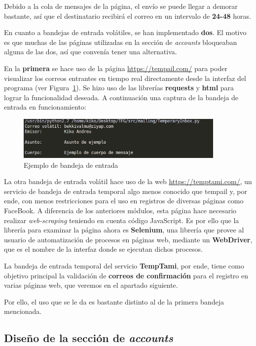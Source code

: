 Debido a la cola de mensajes de la página, el envío se puede llegar a demorar bastante, así que el destinatario recibirá el correo en un intervalo de \textbf{24-48} horas.

En cuanto a bandejas de entrada volátiles, se han implementado \textbf{dos}. El motivo es que muchas de las páginas utilizadas en la sección de \textit{accounts} bloqueaban alguna de las dos, así que convenía tener una alternativa.

En la \textbf{primera} se hace uso de la página \url{https://tempail.com/} para poder visualizar los correos entrantes en tiempo real directamente desde la interfaz del programa (ver Figura~\ref{fig:tempail_inbox}). Se hizo uso de las librerías \textbf{requests} y \textbf{html} para lograr la funcionalidad deseada. A continuación una captura de la bandeja de entrada en funcionamiento:

\begin{figure}[H]
	\centerline{
		\mbox{\includegraphics[width=4.00in]{images/inbox1.png}}
	}
	\caption{Ejemplo de bandeja de entrada}
	\label{fig:tempail_inbox}
\end{figure}

La otra bandeja de entrada volátil hace uso de la web \url{https://temptami.com/}, un servicio de bandeja de entrada temporal algo menos conocido que tempail y, por ende, con menos restricciones para el uso en registros de diversas páginas como FaceBook. A diferencia de los anteriores módulos, esta página hace necesario realizar \textit{web-scraping} teniendo en cuenta código JavaScript. Es por ello que la librería para examinar la página ahora es \textbf{Selenium}, una librería que provee al usuario de automatización de procesos en páginas web, mediante un \textbf{WebDriver}, que es el nombre de la interfaz donde se ejecutan dichos procesos. 

La bandeja de entrada temporal del servicio \textbf{TempTami}, por ende, tiene como objetivo principal la validación de \textbf{correos de confirmación} para el registro en varias páginas web, que veremos en el apartado siguiente. 

Por ello, el uso que se le da es bastante distinto al de la primera bandeja mencionada.

\subsection{Diseño de la sección de \textit{accounts}}

